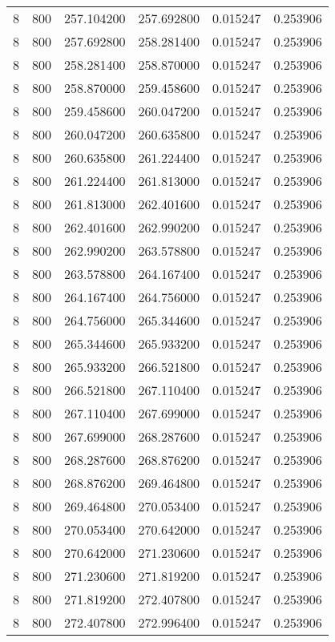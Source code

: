 \begin{longtable}{rrrrrr}
8 & 800 & 257.104200 & 257.692800 & 0.015247 & 0.253906 \\
8 & 800 & 257.692800 & 258.281400 & 0.015247 & 0.253906 \\
8 & 800 & 258.281400 & 258.870000 & 0.015247 & 0.253906 \\
8 & 800 & 258.870000 & 259.458600 & 0.015247 & 0.253906 \\
8 & 800 & 259.458600 & 260.047200 & 0.015247 & 0.253906 \\
8 & 800 & 260.047200 & 260.635800 & 0.015247 & 0.253906 \\
8 & 800 & 260.635800 & 261.224400 & 0.015247 & 0.253906 \\
8 & 800 & 261.224400 & 261.813000 & 0.015247 & 0.253906 \\
8 & 800 & 261.813000 & 262.401600 & 0.015247 & 0.253906 \\
8 & 800 & 262.401600 & 262.990200 & 0.015247 & 0.253906 \\
8 & 800 & 262.990200 & 263.578800 & 0.015247 & 0.253906 \\
8 & 800 & 263.578800 & 264.167400 & 0.015247 & 0.253906 \\
8 & 800 & 264.167400 & 264.756000 & 0.015247 & 0.253906 \\
8 & 800 & 264.756000 & 265.344600 & 0.015247 & 0.253906 \\
8 & 800 & 265.344600 & 265.933200 & 0.015247 & 0.253906 \\
8 & 800 & 265.933200 & 266.521800 & 0.015247 & 0.253906 \\
8 & 800 & 266.521800 & 267.110400 & 0.015247 & 0.253906 \\
8 & 800 & 267.110400 & 267.699000 & 0.015247 & 0.253906 \\
8 & 800 & 267.699000 & 268.287600 & 0.015247 & 0.253906 \\
8 & 800 & 268.287600 & 268.876200 & 0.015247 & 0.253906 \\
8 & 800 & 268.876200 & 269.464800 & 0.015247 & 0.253906 \\
8 & 800 & 269.464800 & 270.053400 & 0.015247 & 0.253906 \\
8 & 800 & 270.053400 & 270.642000 & 0.015247 & 0.253906 \\
8 & 800 & 270.642000 & 271.230600 & 0.015247 & 0.253906 \\
8 & 800 & 271.230600 & 271.819200 & 0.015247 & 0.253906 \\
8 & 800 & 271.819200 & 272.407800 & 0.015247 & 0.253906 \\
8 & 800 & 272.407800 & 272.996400 & 0.015247 & 0.253906 \\

\end{longtable}
